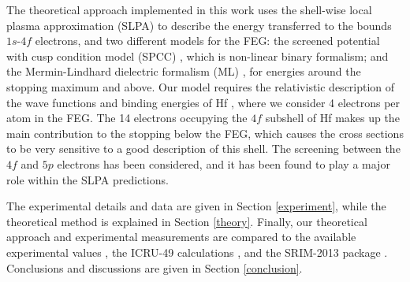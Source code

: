 \documentclass[aps,prb,reprint,groupedaddress]{revtex4-1}
\begin{document}
The theoretical approach implemented in this work uses the shell-wise local plasma approximation (SLPA) \cite{mon13} to describe the energy transferred to the bounds $1s$-$4f$ electrons, and two different models for the FEG: the screened potential with cusp condition model (SPCC) \cite{mon17}, which is non-linear binary formalism; and the Mermin-Lindhard dielectric formalism (ML) \cite{Mermin}, for energies around the stopping maximum and above. 
Our model requires the relativistic description of the wave functions and binding energies of Hf \cite{mendez2019}, where we consider 4 electrons per atom in the FEG. 
The 14 electrons occupying the $4f$ subshell of Hf makes up the main contribution to the stopping below the FEG, which causes the cross sections to be very sensitive to a good description of this shell. 
The screening between the $4f$ and $5p$ electrons has been considered, and it has been found to play a major role within the SLPA predictions.


The experimental details and data are given in Section \ref{experiment}, while the theoretical method is explained in Section \ref{theory}. Finally, our theoretical approach and experimental measurements are compared to the available experimental values \cite{Sirotinin}, the ICRU-49 calculations \cite{ICRU49}, and the SRIM-2013 package \cite{Ziegler01}. Conclusions and discussions are given in Section \ref{conclusion}.

\end{document}
